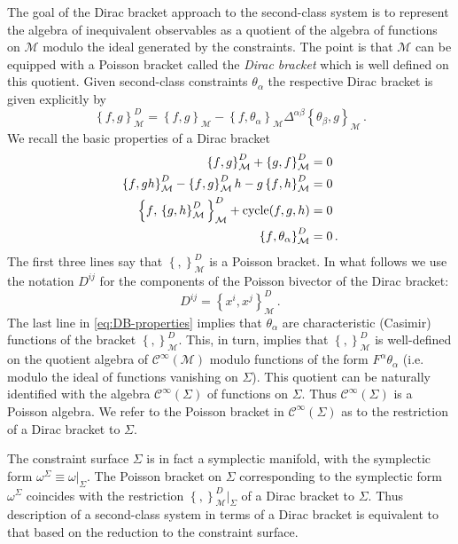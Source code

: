 \documentclass[a4paper,11pt]{amsart}
\numberwithin{thm}{section} %
\numberwithin{equation}{section} %
\numberwithin{figure}{section} %
\newcommand{\pb}[2]{\left\{{}#1{},{}#2{}\right\}}
\renewcommand{\:}{{\rm\, :\,}}
\newcommand{\func}[1]{{{\mathcal C}^\infty}{(#1)}}             %
\def\manM{{\mathcal M}}
\begin{document}
The goal of the Dirac bracket approach to the second-class system
is to represent the algebra of inequivalent observables as a quotient
of the algebra of functions on $\manM$ modulo the ideal generated by
the constraints. The point is that $\manM$ can be equipped with a
Poisson bracket called the \textit{Dirac bracket} which is well defined on
this quotient.  Given second-class constraints $\theta_\alpha$ the
respective Dirac bracket is given explicitly by
\begin{equation}
  \label{eq:Dirac}
\pb{f}{g}^D_\manM=\pb{f}{g}_\manM-
\pb{f}{\theta_\alpha}_\manM \Delta^{\alpha \beta} \pb{\theta_\beta}{g}_\manM\,.
\end{equation}
We recall the basic properties of a Dirac bracket
\begin{equation}
\label{eq:DB-properties}
  \begin{split}
\pb{f}{g}^D_\manM+\pb{g}{f}^D_\manM&=0\\
\pb{f}{gh}^D_\manM-\pb{f}{g}^D_\manM h- g \pb{f}{h}^D_\manM& =0\\
\pb{f}{\pb{g}{h}^D_\manM}^D_\manM+{\rm cycle}(f,g,h)&=0\\
\pb{f}{\theta_\alpha}^D_\manM&=0\,.
\end{split}
\end{equation}
The first three lines say that $\pb{}{}^D_\manM$ is a Poisson
bracket.  In what follows we use the notation
$D^{ij}$ for the components of the Poisson bivector of the Dirac bracket:
\begin{equation}
D^{ij}=\pb{x^i}{x^j}^D_\manM\,.
\end{equation}
The last line in \eqref{eq:DB-properties} implies that $\theta_\alpha$
are characteristic  (Casimir) functions of the bracket
$\pb{}{}^D_\manM$. This, in turn, implies that
$\pb{}{}^D_\manM$ is well-defined on the quotient
algebra of $\func{\manM}$ modulo functions of the form
$F^\alpha\theta_{\alpha}$ (i.e. modulo the ideal
of functions vanishing on $\Sigma$). This quotient can be naturally
identified with the algebra $\func\Sigma$ of functions on $\Sigma$.
Thus $\func\Sigma$ is a Poisson algebra.  We refer to the Poisson
bracket in $\func\Sigma$ as to the restriction of a Dirac bracket
to $\Sigma$.


The constraint surface $\Sigma$ is in fact a symplectic manifold,
with the symplectic form $\omega^\Sigma\equiv \omega\big|_{\Sigma}$.
The Poisson bracket on $\Sigma$ corresponding to the symplectic form
$\omega^\Sigma$ coincides with the restriction
$\pb{}{}^D_\manM{\bigr|}_\Sigma$ of a Dirac bracket to $\Sigma$.
Thus description of a second-class system in terms
of a Dirac bracket is equivalent to that based on the
reduction to the constraint surface.
\end{document}
